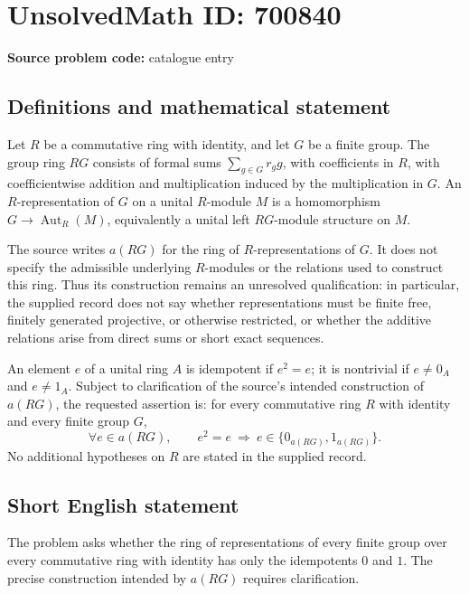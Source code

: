 \documentclass[11pt]{article}
\begin{document}
\section*{UnsolvedMath ID: 700840}
\textbf{Source problem code:} catalogue entry
\subsection{Definitions and mathematical statement}
Let \(R\) be a commutative ring with identity, and let \(G\) be a finite group. The group ring \(RG\) consists of formal sums \(\sum_{g\in G}r_g g\), with coefficients in \(R\), with coefficientwise addition and multiplication induced by the multiplication in \(G\). An \(R\)-representation of \(G\) on a unital \(R\)-module \(M\) is a homomorphism \(G\to\operatorname{Aut}_R(M)\), equivalently a unital left \(RG\)-module structure on \(M\).

The source writes \(a(RG)\) for the ring of \(R\)-representations of \(G\). It does not specify the admissible underlying \(R\)-modules or the relations used to construct this ring. Thus its construction remains an unresolved qualification: in particular, the supplied record does not say whether representations must be finite free, finitely generated projective, or otherwise restricted, or whether the additive relations arise from direct sums or short exact sequences.

An element \(e\) of a unital ring \(A\) is idempotent if \(e^2=e\); it is nontrivial if \(e\ne 0_A\) and \(e\ne 1_A\). Subject to clarification of the source's intended construction of \(a(RG)\), the requested assertion is: for every commutative ring \(R\) with identity and every finite group \(G\),
\[
\forall e\in a(RG),\qquad e^2=e\ \Longrightarrow\ e\in\{0_{a(RG)},1_{a(RG)}\}.
\]
No additional hypotheses on \(R\) are stated in the supplied record.
\subsection{Short English statement}
The problem asks whether the ring of representations of every finite group over every commutative ring with identity has only the idempotents \(0\) and \(1\). The precise construction intended by \(a(RG)\) requires clarification.
\end{document}
